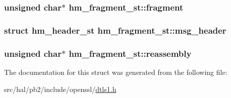 \subsubsection[{\texorpdfstring{fragment}{fragment}}]{\setlength{\rightskip}{0pt plus 5cm}unsigned char$\ast$ hm\+\_\+fragment\+\_\+st\+::fragment}\hypertarget{structhm__fragment__st_ab36bd817673b28cc64b927b62faf7225}{}\label{structhm__fragment__st_ab36bd817673b28cc64b927b62faf7225}
\subsubsection[{\texorpdfstring{msg\+\_\+header}{msg_header}}]{\setlength{\rightskip}{0pt plus 5cm}struct {\bf hm\+\_\+header\+\_\+st} hm\+\_\+fragment\+\_\+st\+::msg\+\_\+header}\hypertarget{structhm__fragment__st_a171c5cb6c7c15bdf7c6401d022247729}{}\label{structhm__fragment__st_a171c5cb6c7c15bdf7c6401d022247729}
\subsubsection[{\texorpdfstring{reassembly}{reassembly}}]{\setlength{\rightskip}{0pt plus 5cm}unsigned char$\ast$ hm\+\_\+fragment\+\_\+st\+::reassembly}\hypertarget{structhm__fragment__st_a50a13bdc9997bc66cb7c578519413510}{}\label{structhm__fragment__st_a50a13bdc9997bc66cb7c578519413510}


The documentation for this struct was generated from the following file\+:\begin{DoxyCompactItemize}
\item 
src/hal/pb2/include/openssl/\hyperlink{dtls1_8h}{dtls1.\+h}\end{DoxyCompactItemize}
